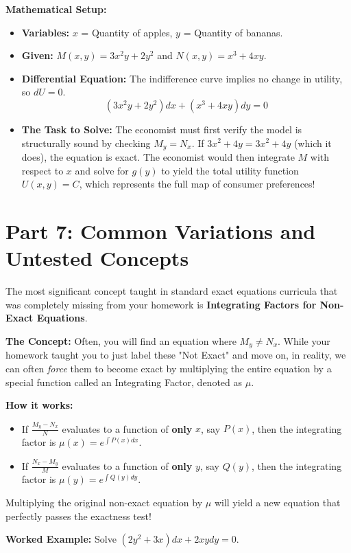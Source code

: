 \documentclass[11pt]{article}
\begin{document}
\textbf{Mathematical Setup:}
\begin{itemize}
    \item \textbf{Variables:} $x$ = Quantity of apples, $y$ = Quantity of bananas.
    \item \textbf{Given:} $M(x,y) = 3x^2y + 2y^2$ and $N(x,y) = x^3 + 4xy$.
    \item \textbf{Differential Equation:} The indifference curve implies no change in utility, so $dU = 0$.
    \[ (3x^2y + 2y^2) dx + (x^3 + 4xy) dy = 0 \]
    \item \textbf{The Task to Solve:} The economist must first verify the model is structurally sound by checking $M_y = N_x$. If $3x^2 + 4y = 3x^2 + 4y$ (which it does), the equation is exact. The economist would then integrate $M$ with respect to $x$ and solve for $g(y)$ to yield the total utility function $U(x,y) = C$, which represents the full map of consumer preferences!
\end{itemize}

\newpage
\section{Part 7: Common Variations and Untested Concepts}

The most significant concept taught in standard exact equations curricula that was completely missing from your homework is \textbf{Integrating Factors for Non-Exact Equations}.

\textbf{The Concept:} 
Often, you will find an equation where $M_y \neq N_x$. While your homework taught you to just label these "Not Exact" and move on, in reality, we can often \textit{force} them to become exact by multiplying the entire equation by a special function called an Integrating Factor, denoted as $\mu$.

\textbf{How it works:}
\begin{itemize}
    \item If $\frac{M_y - N_x}{N}$ evaluates to a function of \textbf{only} $x$, say $P(x)$, then the integrating factor is $\mu(x) = e^{\int P(x) dx}$.
    \item If $\frac{N_x - M_y}{M}$ evaluates to a function of \textbf{only} $y$, say $Q(y)$, then the integrating factor is $\mu(y) = e^{\int Q(y) dy}$.
\end{itemize}
Multiplying the original non-exact equation by $\mu$ will yield a new equation that perfectly passes the exactness test!

\textbf{Worked Example:}
Solve $\left(2y^2 + 3x\right) dx + 2xy dy = 0$.
\end{document}
